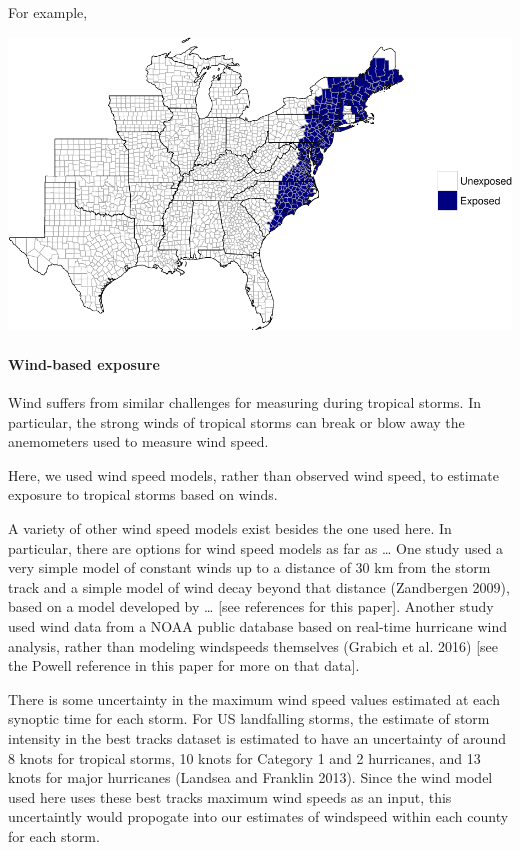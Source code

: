 \documentclass[]{elsarticle} %
\makeatletter
\def\maxwidth{\ifdim\Gin@nat@width>\linewidth\linewidth
\else\Gin@nat@width\fi}
\let\Oldincludegraphics\includegraphics
\renewcommand{\includegraphics}[1]{\Oldincludegraphics[width=\maxwidth]{#1}}
\makeatother
\begin{document}
For example,

\includegraphics{DraftExposurePaper_files/figure-latex/unnamed-chunk-3-1.pdf}

\paragraph{Wind-based exposure}\label{wind-based-exposure-1}

Wind suffers from similar challenges for measuring during tropical
storms. In particular, the strong winds of tropical storms can break or
blow away the anemometers used to measure wind speed.

Here, we used wind speed models, rather than observed wind speed, to
estimate exposure to tropical storms based on winds.

A variety of other wind speed models exist besides the one used here. In
particular, there are options for wind speed models as far as \ldots{}
One study used a very simple model of constant winds up to a distance of
30 km from the storm track and a simple model of wind decay beyond that
distance (Zandbergen 2009), based on a model developed by \ldots{}
{[}see references for this paper{]}. Another study used wind data from a
NOAA public database based on real-time hurricane wind analysis, rather
than modeling windspeeds themselves (Grabich et al. 2016) {[}see the
Powell reference in this paper for more on that data{]}.

There is some uncertainty in the maximum wind speed values estimated at
each synoptic time for each storm. For US landfalling storms, the
estimate of storm intensity in the best tracks dataset is estimated to
have an uncertainty of around 8 knots for tropical storms, 10 knots for
Category 1 and 2 hurricanes, and 13 knots for major hurricanes (Landsea
and Franklin 2013). Since the wind model used here uses these best
tracks maximum wind speeds as an input, this uncertaintly would
propogate into our estimates of windspeed within each county for each
storm.
\end{document}
